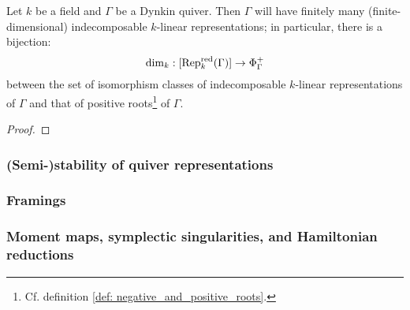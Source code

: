             \begin{theorem} \label{theorem: geometric_gabriel_theorem_dynkin_implies_representation_finite}
                Let $k$ be a field and $\Gamma$ be a Dynkin quiver. Then $\Gamma$ will have finitely many (finite-dimensional) indecomposable $k$-linear representations; in particular, there is a bijection:
                    $$\dim_k: [\mathrm{Rep}_k^{\mathrm{red}}(\Gamma)] \to \Phi_{\Gamma}^+$$
                between the set of isomorphism classes of indecomposable $k$-linear representations of $\Gamma$ and that of positive roots\footnote{Cf. definition \ref{def: negative_and_positive_roots}.} of $\Gamma$.
            \end{theorem}
                \begin{proof}
                    
                \end{proof}
                
            \begin{example}
                
            \end{example}
            \begin{example}
                
            \end{example}
            \begin{example}
                
            \end{example}
            \begin{example}
                
            \end{example}
            \begin{example}
                
            \end{example}
            
        \subsubsection{(Semi-)stability of quiver representations}
    
        \subsubsection{Framings}
    
        \subsubsection{Moment maps, symplectic singularities, and Hamiltonian reductions}